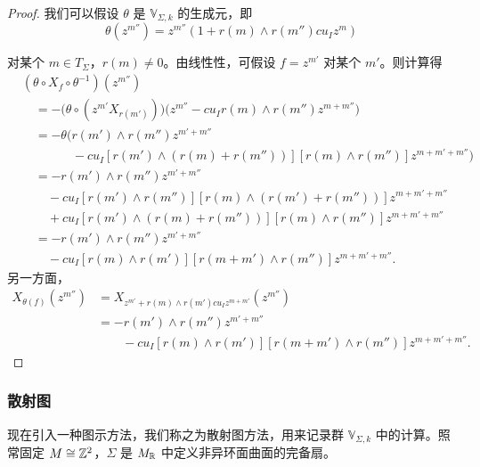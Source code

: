\begin{proof}
我们可以假设 $\theta$ 是 $\mathbb V_{\Sigma,k}$ 的生成元，即
\[
  \theta(z^{m''})=z^{m''}(1+r(m)\wedge r(m'')cu_Iz^m)
\]

对某个 $m\in T_\Sigma$，$r(m)\ne0$。由线性性，可假设 $f=z^{m'}$ 对某个 $m'$。则计算得
\[
  \begin{aligned}
    &(\theta\circ X_f\circ\theta^{-1})(z^{m''})\\
    &\quad=-\bigl(\theta\circ(z^{m'}X_{r(m')})\bigr)\bigl(z^{m''}-cu_Ir(m)\wedge r(m'')z^{m+m''}\bigr)\\
    &\quad=-\theta\bigl(r(m')\wedge r(m'')z^{m'+m''}\\
    &\qquad\qquad-cu_I[r(m')\wedge(r(m)+r(m''))][r(m)\wedge r(m'')]z^{m+m'+m''}\bigr)\\
    &\quad=-r(m')\wedge r(m'')z^{m'+m''}\\
    &\qquad-cu_I[r(m')\wedge r(m'')][r(m)\wedge(r(m')+r(m''))]z^{m+m'+m''}\\
    &\qquad+cu_I[r(m')\wedge(r(m)+r(m''))][r(m)\wedge r(m'')]z^{m+m'+m''}\\
    &\quad=-r(m')\wedge r(m'')z^{m'+m''}\\
    &\qquad-cu_I[r(m)\wedge r(m')][r(m+m')\wedge r(m'')]z^{m+m'+m''}.
  \end{aligned}
\]
另一方面，
\[
  \begin{aligned}
    X_{\theta(f)}(z^{m''})
    &=X_{z^{m'}+r(m)\wedge r(m')cu_Iz^{m+m'}}(z^{m''})\\
    &=-r(m')\wedge r(m'')z^{m'+m''}\\
    &\qquad-cu_I[r(m)\wedge r(m')][r(m+m')\wedge r(m'')]z^{m+m'+m''}.
  \end{aligned}
\]
\end{proof}

\subsubsection{散射图}

现在引入一种图示方法，我们称之为散射图方法，用来记录群 $\mathbb V_{\Sigma,k}$ 中的计算。照常固定 $M\cong\mathbb{Z}^2$，$\Sigma$ 是 $M_{\mathbb{R}}$ 中定义非异环面曲面的完备扇。

